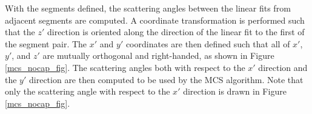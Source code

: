 \documentclass[a4paper,11pt]{article}
\begin{document}
With the segments defined, the scattering angles between the linear fits from adjacent segments are computed. A coordinate transformation is performed such that the $z'$ direction is oriented along the direction of the linear fit to the first of the segment pair. The $x'$ and $y'$ coordinates are then defined such that all of $x'$, $y'$, and $z'$ are mutually orthogonal and right-handed, as shown in Figure \ref{mcs_nocap_fig}. The scattering angles both with respect to the $x'$ direction and the $y'$ direction are then computed to be used by the MCS algorithm. Note that only the scattering angle with respect to the $x'$ direction is drawn in Figure \ref{mcs_nocap_fig}.



\end{document}
